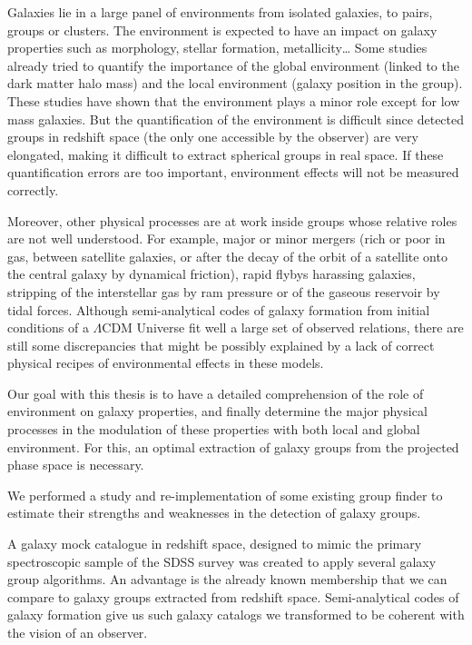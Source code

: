 %
\begin{bartabstract}
    \small

    Galaxies lie in a large panel of environments from isolated galaxies, to
    pairs, groups or clusters. The environment is expected to have an impact on
    galaxy properties such as morphology, stellar formation, metallicity\ldots
    Some studies already tried to quantify the importance of the global
    environment (linked to the dark matter halo mass) and the local environment
    (galaxy position in the group). These studies have shown that the
    environment plays a minor role except for low mass galaxies. But the
    quantification of the environment is difficult since detected groups in
    redshift space (the only one accessible by the observer) are very
    elongated, making it difficult to extract spherical groups in real space.
    If these quantification errors are too important, environment effects will
    not be measured correctly.

    Moreover, other physical processes are at work inside groups whose relative
    roles are not well understood. For example, major or minor mergers (rich or
    poor in gas, between satellite galaxies, or after the decay of the orbit of
    a satellite onto the central galaxy by dynamical friction), rapid flybys
    harassing galaxies, stripping of the interstellar gas by ram pressure or of
    the gaseous reservoir by tidal forces. Although semi-analytical codes of
    galaxy formation from initial conditions of a $\Lambda$CDM Universe fit
    well a large set of observed relations, there are still some discrepancies
    that might be possibly explained by a lack of correct physical recipes of
    environmental effects in these models.

    Our goal with this thesis is to have a detailed comprehension of the role
    of environment on galaxy properties, and finally determine the major
    physical processes in the modulation of these properties with both local
    and global environment. For this, an optimal extraction of galaxy groups
    from the projected phase space is necessary.

    We performed a study and re-implementation of some existing group finder to
    estimate their strengths and weaknesses in the detection of galaxy groups.

    A galaxy mock catalogue in redshift space, designed to mimic the primary
    spectroscopic sample of the SDSS survey was created to apply several galaxy
    group algorithms. An advantage is the already known membership that we can
    compare to galaxy groups extracted from redshift space. Semi-analytical
    codes of galaxy formation give us such galaxy catalogs we transformed to be
    coherent with the vision of an observer.


\end{bartabstract}
